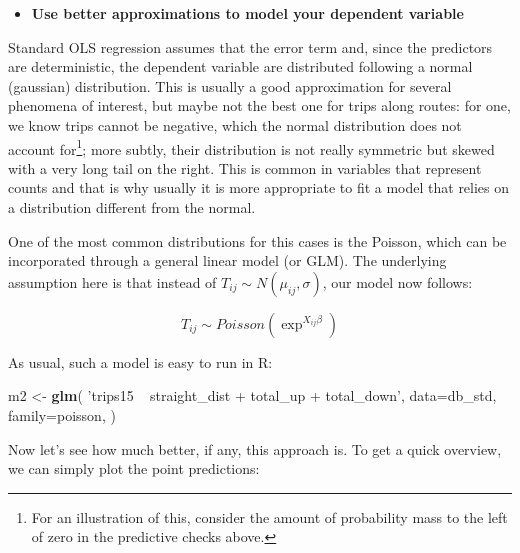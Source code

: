 \documentclass[
]{book}
\newenvironment{Shaded}{\begin{snugshade}}{\end{snugshade}}
\newcommand{\DataTypeTok}[1]{\textcolor[rgb]{0.13,0.29,0.53}{#1}}
\newcommand{\KeywordTok}[1]{\textcolor[rgb]{0.13,0.29,0.53}{\textbf{#1}}}
\newcommand{\NormalTok}[1]{#1}
\newcommand{\StringTok}[1]{\textcolor[rgb]{0.31,0.60,0.02}{#1}}
\providecommand{\tightlist}{%
  \setlength{\itemsep}{0pt}\setlength{\parskip}{0pt}}
\begin{document}
\begin{itemize}
\tightlist
\item
  \textbf{Use better approximations to model your dependent variable}
\end{itemize}

Standard OLS regression assumes that the error term and, since the predictors are deterministic, the dependent variable are distributed following a normal (gaussian) distribution. This is usually a good approximation for several phenomena of interest, but maybe not the best one for trips along routes: for one, we know trips cannot be negative, which the normal distribution does not account for\footnote{For an illustration of this, consider the amount of probability mass to the left of zero in the predictive checks above.}; more subtly, their distribution is not really symmetric but skewed with a very long tail on the right. This is common in variables that represent counts and that is why usually it is more appropriate to fit a model that relies on a distribution different from the normal.

One of the most common distributions for this cases is the Poisson, which can be incorporated through a general linear model (or GLM). The underlying assumption here is that instead of \(T_{ij} \sim N(\mu_{ij}, \sigma)\), our model now follows:

\[
T_{ij} \sim Poisson (\exp^{X_{ij}\beta})
\]

As usual, such a model is easy to run in R:

\begin{Shaded}
\begin{Highlighting}[]
\NormalTok{m2 <-}\StringTok{ }\KeywordTok{glm}\NormalTok{(}
  \StringTok{'trips15 ~ straight_dist + total_up + total_down'}\NormalTok{, }
  \DataTypeTok{data=}\NormalTok{db_std,}
  \DataTypeTok{family=}\NormalTok{poisson,}
\NormalTok{)}
\end{Highlighting}
\end{Shaded}

Now let's see how much better, if any, this approach is. To get a quick overview, we can simply plot the point predictions:
\end{document}

